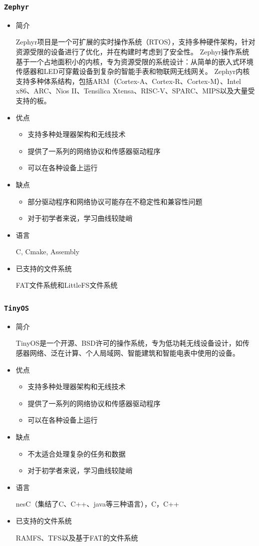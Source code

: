 \documentclass[UTF8,a4paper]{ctexart}
\begin{document}
\subsubsection{\texttt{Zephyr}}
\begin{itemize}
\item 简介

Zephyr项目是一个可扩展的实时操作系统（RTOS），支持多种硬件架构，针对资源受限的设备进行了优化，并在构建时考虑到了安全性。
Zephyr操作系统基于一个占地面积小的内核，专为资源受限的系统设计：从简单的嵌入式环境传感器和LED可穿戴设备到复杂的智能手表和物联网无线网关。
Zephyr内核支持多种体系结构，包括ARM（Cortex-A、Cortex-R、Cortex-M）、Intel x86、ARC、Nios II、Tensilica Xtensa、RISC-V、SPARC、MIPS以及大量受支持的板。

\item 优点
\begin{itemize}
    \item 支持多种处理器架构和无线技术
    \item 提供了一系列的网络协议和传感器驱动程序
    \item 可以在各种设备上运行 
\end{itemize}
\item 缺点
\begin{itemize}
    \item 部分驱动程序和网络协议可能存在不稳定性和兼容性问题
    \item 对于初学者来说，学习曲线较陡峭 
\end{itemize}
\item 语言

C, Cmake, Assembly
\item 已支持的文件系统

FAT文件系统和LittleFS文件系统
\end{itemize}
\subsubsection{\texttt{TinyOS}}
\begin{itemize}
\item 简介

TinyOS是一个开源、BSD许可的操作系统，专为低功耗无线设备设计，如传感器网络、泛在计算、个人局域网、智能建筑和智能电表中使用的设备。
\item 优点
\begin{itemize}
    \item 支持多种处理器架构和无线技术
    \item 提供了一系列的网络协议和传感器驱动程序
    \item 可以在各种设备上运行 
\end{itemize}
\item 缺点
\begin{itemize}
    \item 不太适合处理复杂的任务和数据
    \item 对于初学者来说，学习曲线较陡峭 
\end{itemize}
\item 语言

nesC（集结了C、C++、java等三种语言），C，C++
\item 已支持的文件系统

RAMFS、TFS以及基于FAT的文件系统
\end{itemize}
\end{document}

